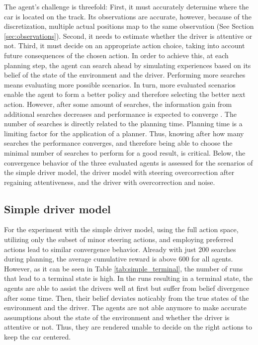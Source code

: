 The agent's challenge is threefold: First, it must accurately determine where the car is located on the track. Its observations are accurate, however, because of the discretization, multiple actual positions map to the same observation (See Section \ref{sec:observations}). Second, it needs to estimate whether the driver is attentive or not. Third, it must decide on an appropriate action choice, taking into account future consequences of the chosen action. In order to achieve this, at each planning step, the agent can search ahead by simulating experiences based on its belief of the state of the environment and the driver. Performing more searches means evaluating more possible scenarios. In turn, more evaluated scenarios enable the agent to form a better policy and therefore selecting the better next action. However, after some amount of searches, the information gain from additional searches decreases and performance is expected to converge \parencite{pomcp}. The number of searches is directly related to the planning time. Planning time is a limiting factor for the application of a planner. Thus, knowing after how many searches the performance converges, and therefore being able to choose the minimal number of searches to perform for a good result, is critical. Below, the convergence behavior of the three evaluated agents is assessed for the scenarios of the simple driver model, the driver model with steering overcorrection after regaining attentiveness, and the driver with overcorrection and noise.

\subsection{Simple driver model}

For the experiment with the simple driver model, using the full action space, utilizing only the subset of minor steering actions, and employing preferred actions lead to similar convergence behavior. Already with just 200 searches during planning, the average cumulative reward is above 600 for all agents. However, as it can be seen in Table \ref{tab:simple_terminal}, the number of runs that lead to a terminal state is high. In the runs resulting in a terminal state, the agents are able to assist the drivers well at first but suffer from belief divergence after some time. Then, their belief deviates noticably from the true states of the environment and the driver. The agents are not able anymore to make accurate assumptions about the state of the environment and whether the driver is attentive or not. Thus, they are rendered unable to decide on the right actions to keep the car centered. 


